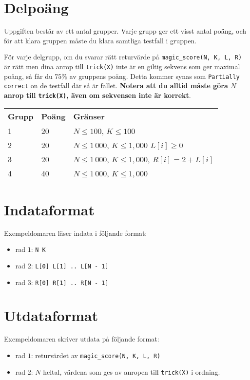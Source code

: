 \section*{Delpoäng}
Uppgiften består av ett antal grupper. Varje grupp ger ett visst antal poäng, och för att klara
gruppen måste du klara samtliga testfall i gruppen.

För varje delgrupp, om du svarar rätt returvärde på \texttt{magic\_score(N, K, L, R)} är rätt men dina anrop till \texttt{trick(X)}
inte är en giltig sekvens som ger maximal poäng, så får du $75\%$ av gruppens poäng.
Detta kommer synas som \texttt{Partially correct} on de testfall där så är fallet. \textbf{Notera att du alltid måste göra $N$ anrop till \texttt{trick(X)},
även om sekvensen inte är korrekt}.

\begin{tabular}{|l|l|l|}
  \hline
  \textbf{Grupp} & \textbf{Poäng} & \textbf{Gränser} \\ \hline
  1 & 20 & $N \le 100$, $K \le 100$ \\ \hline
  2 & 20 & $N \le 1\,000$, $K \le 1,000$ $L[i] \ge 0$\\ \hline
  3 & 20 & $N \le 1\,000$, $K \le 1,000$, $R[i] = 2 + L[i]$ \\ \hline
  4 & 40 & $N \le 1\,000$, $K \le 1,000$ \\ \hline
\end{tabular}

\section*{Indataformat}
Exempeldomaren läser indata i följande format:

\begin{itemize}
  \item rad $1$: \texttt{N K}
  \item rad $2$: \texttt{L[0] L[1] .. L[N - 1]}
  \item rad $3$: \texttt{R[0] R[1] .. R[N - 1]}
\end{itemize}

\section*{Utdataformat}
Exempeldomaren skriver utdata på följande format:

\begin{itemize}
  \item rad $1$: returvärdet av \texttt{magic\_score(N, K, L, R)}
  \item rad $2$: $N$ heltal, värdena som ges av anropen till \texttt{trick(X)} i ordning.
\end{itemize}
